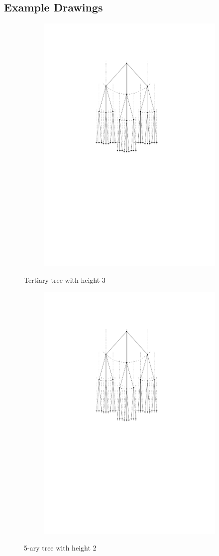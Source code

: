 \subsection{Example Drawings}
\begin{figure}[H]
	\centering
	\begin{subfigure}{\textwidth}
		\centering
		\includegraphics[page=1,width=0.6\linewidth]{graphics/k-ary_tree_example_drawings.pdf}
	\end{subfigure}
	\caption{Tertiary tree with height 3}\label{im:3-ary_tree}
\end{figure}
\begin{figure}[H]
	\centering
	\begin{subfigure}{\textwidth}
		\centering
		\includegraphics[page=2,width=0.6\linewidth]{graphics/k-ary_tree_example_drawings.pdf}
	\end{subfigure}
	\caption{5-ary tree with height 2}\label{im:4-ary_tree}
\end{figure}

